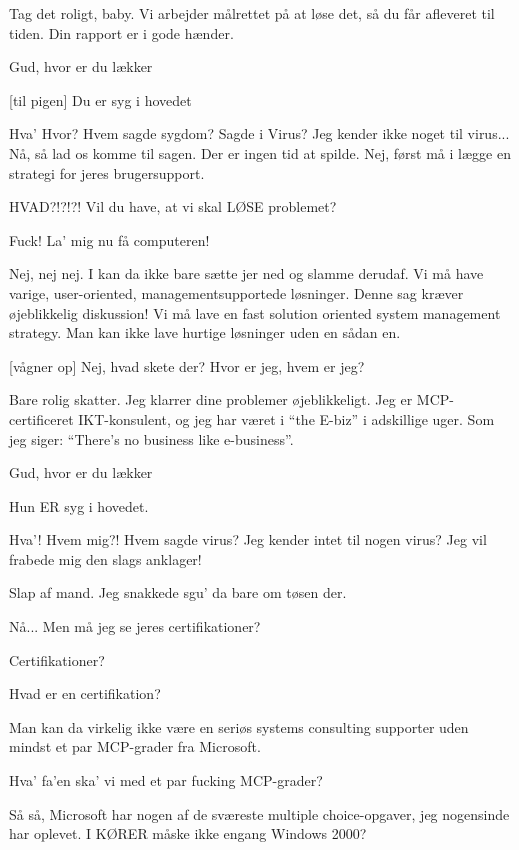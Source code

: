 \documentclass[danish]{article}
\begin{document}
\begin{sketch}
 Tag det roligt, baby. Vi arbejder målrettet på at løse det, så du får
afleveret til tiden. Din rapport er i gode hænder.

  Gud, hvor er du lækker 

[til pigen] Du er syg i hovedet

 Hva' Hvor? Hvem sagde sygdom? Sagde i Virus? Jeg kender ikke noget til
virus...  Nå, så lad os komme til
sagen. Der er ingen tid at spilde. Nej, først må i lægge en strategi for jeres
brugersupport.

 HVAD?!?!?! Vil du have, at vi skal LØSE problemet?

 Fuck! La' mig nu få computeren!

 Nej, nej nej. I kan da ikke bare sætte jer ned og slamme derudaf. Vi
må have varige, user-oriented, managementsupportede løsninger. Denne sag kræver
øjeblikkelig diskussion! Vi må lave en fast solution oriented system management
strategy. Man kan ikke lave hurtige løsninger uden en sådan en.

[vågner op] Nej, hvad skete der? Hvor er jeg, hvem er jeg?

 Bare rolig skatter. Jeg klarrer dine problemer øjeblikkeligt. Jeg er
MCP-certificeret IKT-konsulent, og jeg har været i ``the E-biz'' i adskillige
uger. Som jeg siger: ``There's no business like e-business''.

 Gud, hvor er du lækker 

 Hun ER syg i hovedet.

 Hva'! Hvem mig?! Hvem sagde virus? Jeg kender intet til nogen virus?
Jeg vil frabede mig den slags anklager!

 Slap af mand. Jeg snakkede sgu' da bare om tøsen der.

 Nå... Men må jeg se jeres certifikationer?

 Certifikationer?

 Hvad er en certifikation?

 Man kan da virkelig ikke være en seriøs systems consulting supporter
uden mindst et par MCP-grader fra Microsoft.

 Hva' fa'en ska' vi med et par fucking MCP-grader? 

 Så så, Microsoft har nogen af de sværeste multiple choice-opgaver, jeg
nogensinde har oplevet. I KØRER måske ikke engang Windows 2000?


\end{sketch}
\end{document}
